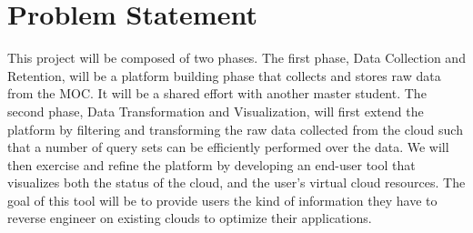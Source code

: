\section{Problem Statement}
\label{sec:ProblemStatement}

%

This project will be composed of two phases. The first phase, Data Collection and Retention, will be a platform building phase that collects and stores raw data from the MOC. It will be a shared effort with another master student.  
The second phase, Data Transformation and Visualization, will first extend the platform by filtering and transforming the raw data collected from the cloud such that a number of query sets can be efficiently performed over the data. We will then exercise and refine the platform by developing an end-user tool that visualizes both the status of the cloud, and the user’s virtual cloud resources. The goal of this tool will be to provide users the kind of information they have to reverse engineer on existing clouds to optimize their applications.







